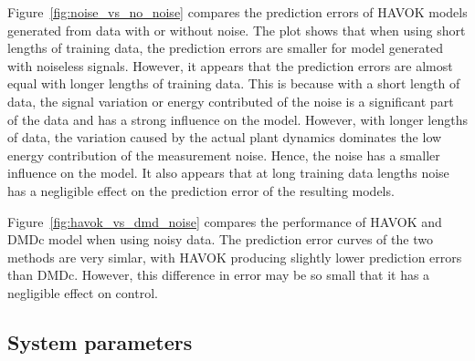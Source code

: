         
        
        

        Figure~\ref{fig:noise_vs_no_noise} compares the prediction errors of \gls{HAVOK} models generated from data with or without noise.
        The plot shows that when using short lengths of training data, 
        the prediction errors are smaller for model generated with noiseless signals.
        However, it appears that the prediction errors are almost equal with longer lengths of training data.
        This is because with a short length of data, the signal variation or energy contributed of the noise is a significant part of the data
        and has a strong influence on the model.
        However, with longer lengths of data, the variation caused by the actual plant dynamics 
        dominates the low energy contribution of the measurement noise. 
        Hence, the noise has a smaller influence on the model.        
        It also appears that at long training data lengths noise has a negligible effect on the prediction error of the resulting models.

        

        Figure~\ref{fig:havok_vs_dmd_noise} compares the performance of \gls{HAVOK} and \gls{DMDc} model when using noisy data.
        The prediction error curves of the two methods are very simlar, with \gls{HAVOK} producing slightly lower prediction errors than \gls{DMDc}.
        However, this difference in error may be so small that it has a negligible effect on control.  

    \subsection{System parameters} \label{sec:system_params}
            

